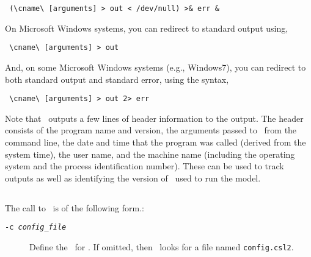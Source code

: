 \begin{verbatim} (\cname\ [arguments] > out < /dev/null) >& err &\end{verbatim}

On Microsoft Windows systems, you can redirect to standard output using,

\begin{verbatim} \cname\ [arguments] > out\end{verbatim}

And, on some Microsoft Windows systems (e.g., Windows7), you can redirect to both standard output and standard error, using the syntax, 

\begin{verbatim} \cname\ [arguments] > out 2> err\end{verbatim}

Note that \CNAME\ outputs a few lines of header information to the output. The header consists of the program name and version, the arguments passed to \CNAME\ from the command line, the date and time that the program was called (derived from the system time), the user name, and the machine name (including the operating system and the process identification number). These can be used to track outputs as well as identifying the version of \CNAME\ used to run the model.

\subsection{\label{sec:command-line-arguments}}
\CH
The call to \CNAME\ is of the following form.: 

\texttt{}

\begin{description}
  \item [\texttt{-c \emph{config\_file}}] Define the \config\ for \CNAME. If omitted, then \CNAME\ looks for a file named \texttt{config.csl2}.
\end{description}


